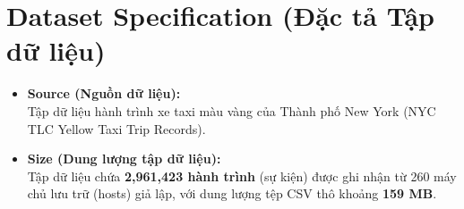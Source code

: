 \documentclass[12pt,a4paper]{article}
\begin{document}
\section{Dataset Specification (Đặc tả Tập dữ liệu)}
\label{sec:dataset}
\begin{itemize}[leftmargin=*]
    \item \textbf{Source (Nguồn dữ liệu):} \\
    Tập dữ liệu hành trình xe taxi màu vàng của Thành phố New York (NYC TLC Yellow Taxi Trip Records).
    
    \item \textbf{Size (Dung lượng tập dữ liệu):} \\
    Tập dữ liệu chứa \textbf{2,961,423 hành trình} (sự kiện) được ghi nhận từ 260 máy chủ lưu trữ (hosts) giả lập, với dung lượng tệp CSV thô khoảng \textbf{159 MB}.


\end{itemize}
\end{document}
